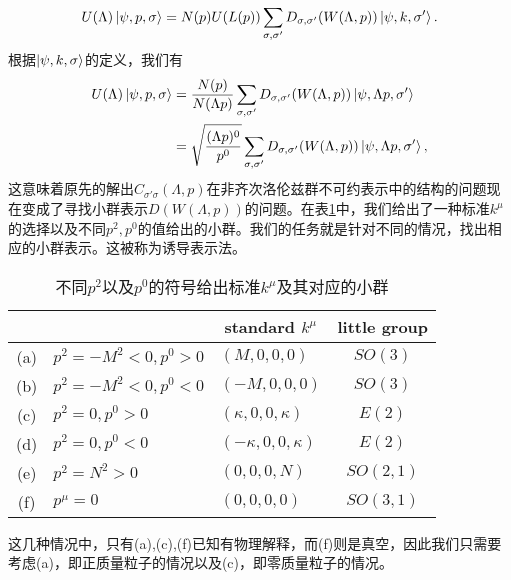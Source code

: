 \begin{equation*}
	U( \Lambda )\ket{\psi ,p,\sigma } =N( p) U( L( p))\sum _{\sigma ,\sigma '} D_{\sigma ,\sigma '}( W( \Lambda ,p))\ket{\psi ,k,\sigma '} .
\end{equation*}根据$ \ket{\psi ,k,\sigma }$的定义，我们有
\begin{equation}
	\begin{aligned}
		U( \Lambda )\ket{\psi ,p,\sigma } & =\frac{N( p)}{N( \Lambda p)}\sum _{\sigma ,\sigma '} D_{\sigma ,\sigma '}( W( \Lambda ,p))\ket{\psi ,\Lambda p,\sigma '}\\
		& =\sqrt{\frac{( \Lambda p)^{0}}{p^{0}}}\sum _{\sigma ,\sigma '} D_{\sigma ,\sigma '}( W( \Lambda ,p))\ket{\psi ,\Lambda p,\sigma '} ,
		\label{eq:general_lorentz_transformation_and_litgrp}
	\end{aligned}
\end{equation}
这意味着原先的解出$C_{\sigma '\sigma }( \Lambda ,p)$在非齐次洛伦兹群不可约表示中的结构的问题现在变成了寻找小群表示$ D( W( \Lambda ,p))$的问题。在表\ref{tbl:litgrp}中，我们给出了一种标准$ k^{\mu }$的选择以及不同$ p^{2} ,p^{0}$的值给出的小群。我们的任务就是针对不同的情况，找出相应的小群表示。这被称为诱导表示法。



\begin{table}
	\centering
	\caption{不同$p^2$以及$p^0$的符号给出标准$k^{\mu}$及其对应的小群}
	\label{tbl:litgrp}
	\begin{tabular}{cllc}
		\toprule\toprule 
		& \multicolumn{1}{c}{} & \multicolumn{1}{c}{standard $ k^{\mu }$} & little group \\
		\midrule 
		(a) & $ p^{2} =-M^{2} < 0,p^{0}  >0$ & $ ( M,0,0,0)$ & $SO( 3)$ \\
		(b) & $ p^{2} =-M^{2} < 0,p^{0} < 0$ & $ ( -M,0,0,0)$ & $SO( 3)$ \\
		(c) & $ p^{2} =0,p^{0}  >0$ & $ ( \kappa ,0,0,\kappa )$ & $E( 2)$ \\
		(d) & $ p^{2} =0,p^{0} < 0$ & $ ( -\kappa ,0,0,\kappa )$ & $E( 2)$ \\
		(e) & $ p^{2} =N^{2}  >0$ & $ ( 0,0,0,N)$ & $SO( 2,1)$ \\
		(f) & $ p^{\mu } =0$ & $ ( 0,0,0,0)$ & $SO( 3,1)$ \\
		\bottomrule\bottomrule
	\end{tabular}
\end{table}



这几种情况中，只有(a),(c),(f)已知有物理解释，而(f)则是真空，因此我们只需要考虑(a)，即正质量粒子的情况以及(c)，即零质量粒子的情况。



